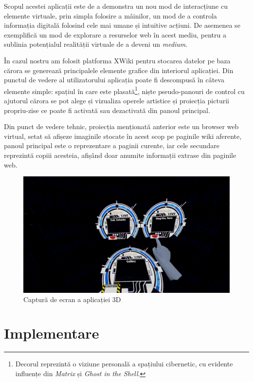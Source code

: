 Scopul acestei aplicații este de a demonstra un nou mod de interacțiune cu elemente virtuale, prin simpla folosire a mâinilor, un mod de a controla informația digitală folosind cele mai umane și intuitive acțiuni.
De asemenea se exemplifică un mod de explorare a resurselor web în acest mediu, pentru a sublinia potențialul realității virtuale de a deveni un \textit{medium}.

În cazul nostru am folosit platforma XWiki pentru stocarea datelor pe baza cărora se generează principalele elemente grafice din interiorul aplicației.
Din punctul de vedere al utilizatorului aplicația poate fi descompusă în câteva elemente simple: spațiul în care este plasată\footnote{Decorul reprezintă o viziune personală a spațiului cibernetic, cu evidente influențe din \textit{Matrix} și \textit{Ghost in the Shell}.}, niște pseudo-panouri de control cu ajutorul cărora se pot alege și vizualiza operele artistice și proiecția picturii propriu-zise ce poate fi activată sau dezactivată din panoul principal.

Din punct de vedere tehnic, proiecția menționată anterior este un browser web virtual, setat să afișeze imaginile stocate în acest scop pe paginile wiki aferente, panoul principal este o reprezentare a paginii curente, iar cele secundare reprezintă copiii acesteia, afișând doar anumite informații extrase din paginile web.

\begin{figure}[h]
  \centering
  \includegraphics[scale=0.28]{img/screenshot1.png}
  \caption{Captură de ecran a aplicației 3D}
\end{figure}


\section{Implementare}

